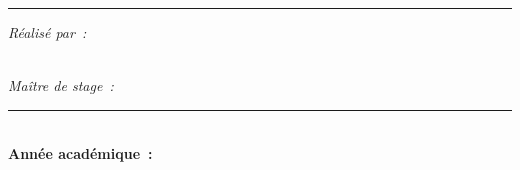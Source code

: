 \begin{titlepage}
{\color{brandgold}\rule{4cm}{0.6pt}}

\vspace{1.8cm}

\begin{minipage}{0.5\textwidth}
  \centering
  {\color{brandnavy}\itshape R\'ealis\'e par~:}\\[0.35cm]
  {\color{brandnavy}\rmfamily\bfseries \etudiantA}\\
  {\color{brandnavy}\rmfamily\bfseries \etudiantB}
\end{minipage}

\vspace{1.6cm}

{\color{brandnavy}\itshape Ma\^itre de stage~:}\\[0.25cm]
{\color{brandnavy}\rmfamily\bfseries \maitredestage}

\vfill

{\color{brandgold}\rule{2.6cm}{0.6pt}}\\[0.4cm]
{\color{brandnavy}\bfseries Ann\'ee acad\'emique~: \anneeacademique}

\vspace{1.2cm}

\end{titlepage}
